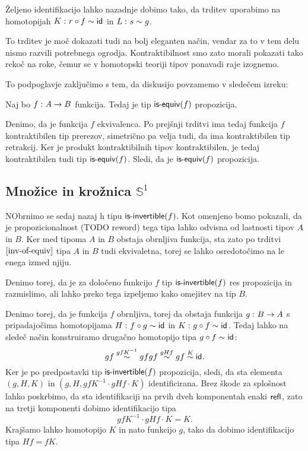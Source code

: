 \begin{dokaz}
\begin{enumerate}
Željeno identifikacijo lahko nazadnje dobimo tako, da trditev uporabimo na homotopijah \(K \,\colon r \circ f \sim \textnormal{\textsf{id}}_{}\) in \(L \,\colon s \sim g\).
\end{enumerate}
\end{dokaz}

To trditev je moč dokazati tudi na bolj eleganten način, vendar za to v tem delu nismo razvili potrebnega ogrodja. Kontraktibilnost smo zato morali pokazati tako rekoč na roke, čemur se v homotopski teoriji tipov ponavadi raje izognemo.

To podpoglavje zaključimo s tem, da diskusijo povzamemo v sledečem izreku:

\begin{izrek}
  Naj bo \(f \,\colon A \to B\) funkcija. Tedaj je tip \(\textnormal{\textsf{is-equiv}}(f)\) propozicija.
\end{izrek}

\begin{dokaz}
  Denimo, da je funkcija \(f\) ekvivalenca. Po prejšnji trditvi ima tedaj funkcija \(f\) kontraktibilen tip prerezov, simetrično pa velja tudi, da ima kontraktibilen tip retrakcij. Ker je produkt kontraktibilnih tipov kontraktibilen, je tedaj kontraktibilen tudi tip \(\textnormal{\textsf{is-equiv}}(f)\). Sledi, da je \(\textnormal{\textsf{is-equiv}}(f)\) propozicija.
\end{dokaz}

\subsection{Množice in krožnica \(\mathbb{S}^{1}\)}

NObrnimo se sedaj nazaj h tipu \(\textnormal{\textsf{is-invertible}}(f)\). Kot omenjeno bomo pokazali, da je propozicionalnost (TODO reword) tega tipa lahko odvisna od lastnosti tipov \(A\) in \(B\). Ker med tipoma \(A\) in \(B\) obstaja obrnljiva funkcija, sta zato po trditvi \(\ref{inv-of-equiv}\) tipa \(A\) in \(B\) tudi ekvivaletna, torej se lahko osredotočimo na le enega izmed njiju.

Denimo torej, da je za določeno funkcijo \(f\) tip \(\textnormal{\textsf{is-invertible}}(f)\) res propozicija in razmislimo, ali lahko preko tega izpeljemo kako omejitev na tip \(B\).

Denimo torej, da je funkcija \(f\) obrnljiva, torej da obstaja funkcija \(g \,\colon B \to A\) s pripadajočima homotopijama \(H \,\colon f \circ g \sim \textnormal{\textsf{id}}_{}\) in \(K \,\colon g \circ f \sim \textnormal{\textsf{id}}_{}\). Tedaj lahko na sledeč način konstruiramo drugačno homotopijo tipa \(g \circ f \sim \textnormal{\textsf{id}}_{}\):
\[gf \overset{gfK^{-1}}{\sim} gfgf \overset{gHf}{\sim} gf \overset{K}{\sim} \textnormal{\textsf{id}}_{}.\]
Ker je po predpostavki tip \(\textnormal{\textsf{is-invertible}}(f)\) propozicija, sledi, da sta elementa \((g, H, K)\)
in \((g, H, gfK^{-1} \cdot gHf \cdot K)\) identificirana. Brez škode za splošnost lahko poskrbimo, da sta identifikaciji na prvih dveh komponentah enaki \(\textnormal{\textsf{refl}}_{}\), zato na tretji komponenti dobimo identifikacijo tipa \[gfK^{-1} \cdot gHf \cdot K = K.\]
Krajšamo lahko homotopijo \(K\) in nato funkcijo \(g\), tako da dobimo identifikacijo tipa
\(Hf = fK\).

